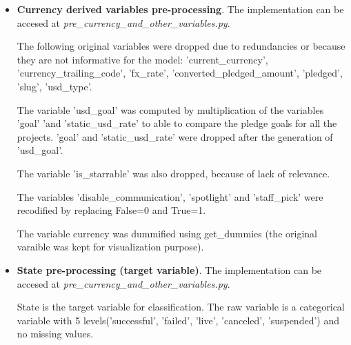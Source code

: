 \documentclass{article}
\begin{document}
{\begin{itemize}
    First, date and time coding variables ('created\_at', 'deadline', 'launched\_at', 'state\_changed\_at') in the raw data are in Unix time format and need to be transformed into datetime. The following variables where computed from the original ones: weekday columns for each date variable, month columns for each date variable, year columns for each date variable.
    
    'initial\_found\_rising\_duration' was computed as the difference in days between 'deadline' and 'launched\_at'.
    
    'found\_rising\_duration' was computed as the difference in days between 'state\_changed\_at' and 'launched\_at'.
    
    'project\_set\_up\_duration' was computed as the difference in days between 'launched\_at' and 'created\_at'.
    
    Date variables were prunned before model training to remove the 'state\_changed\_at' derived ones.
    
    \item \textbf{Currency derived variables pre-processing}.
    The implementation can be accesed at \emph{pre\_currency\_and\_other\_variables.py}.
    
    The following original variables were dropped due to redundancies or because they are not informative for the model: 'current\_currency', 'currency\_trailing\_code', 'fx\_rate', 'converted\_pledged\_amount', 'pledged', 'slug', 'usd\_type'.
    
    The variable 'usd\_goal' was computed by multiplication of the variables 'goal' 'and 'static\_usd\_rate' to able to compare the pledge goals for all the projects. 'goal' and 'static\_usd\_rate' were dropped after the generation of 'usd\_goal'.
    
    The variable 'is\_starrable' was also dropped, because of lack of relevance.
    
    The variables 'disable\_communication', 'spotlight' and 'staff\_pick' were recodified by replacing False=0 and True=1.
    
    The variable currency was dummified using get\_dummies (the original varaible was kept for visualization purpose).

    \item \textbf{State pre-processing (target variable)}.
    The implementation can be accesed at \emph{pre\_currency\_and\_other\_variables.py}.
    
    State is the target variable for classification. The raw variable is a categorical variable with 5 levels('successful', 'failed', 'live', 'canceled', 'suspended') and  no missing values.
    

\end{itemize}}
\end{document}
